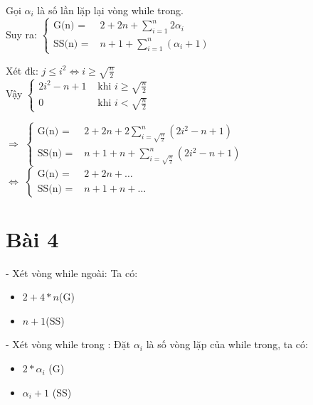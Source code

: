 \documentclass{article}
\newcommand\tab[1][1cm]{\hspace*{#1}}
\begin{document}
Gọi $\alpha_{i}$ là số lần lặp lại vòng while trong.\\

\tab Suy ra:
\(
\begin{cases}
    \text{G(n) = } & 2 +2n +  \sum\limits_{i=1}^{n}2\alpha_{i} \\
    \text{SS(n) = } &  n + 1 + \sum\limits_{i=1}^{n}(\alpha_{i}+1)
\end{cases}
\)

\vspace{7mm}
\tab Xét đk: $ j \leq i^2 \Leftrightarrow i \geq \sqrt{\frac{n}{2}} $ \\

\vspace{7mm}
\tab Vậy 
\(
\begin{cases}
    2i^2 - n +1 & \text{ khi } i \geq \sqrt{\frac{n}{2}} \\
    0 & \text{ khi } i < \sqrt{\frac{n}{2}}
\end{cases}
\)

\vspace{7mm}
\tab $\Rightarrow $
\(
\begin{cases}
    \text{G(n) = } & 2 +2n + 2\sum\limits_{i=\sqrt{\frac{n}{2}}}^{n}{(2i^2 - n +1)} \\
    \text{SS(n) = } &  n + 1 + n + \sum\limits_{i=\sqrt{\frac{n}{2}}}^{n}{(2i^2 - n +1)}
\end{cases}
\)\\

\vspace{4mm}
\tab $\Leftrightarrow $
\(
\begin{cases}
    \text{G(n) = } & 2 +2n + \dots \\
    \text{SS(n) = } &  n + 1 + n + \dots
\end{cases}
\)\\
\section*{Bài 4}

- Xét vòng while ngoài:
Ta có:
\begin{itemize}
    \item $ 2+4*n $(G)
    \item $ n + 1 $(SS)
\end{itemize}

- Xét vòng while trong :
Đặt $\alpha_{i}$ là số vòng lặp của while trong, ta có:
\begin{itemize}
    \item $ 2*\alpha_{i}$ (G)
    \item $ \alpha_{i} + 1$ (SS)
\end{itemize}
\end{document}
